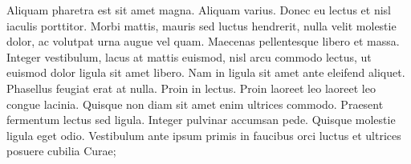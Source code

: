 Aliquam pharetra est sit amet magna. Aliquam varius. Donec eu lectus
et nisl iaculis porttitor. Morbi mattis, mauris sed luctus
hendrerit, nulla velit molestie dolor, ac volutpat urna augue vel
quam. Maecenas pellentesque libero et massa. Integer vestibulum,
lacus at mattis euismod, nisl arcu commodo lectus, ut euismod dolor
ligula sit amet libero. Nam in ligula sit amet ante eleifend
aliquet. Phasellus feugiat erat at nulla. Proin in lectus. Proin
laoreet leo laoreet leo congue lacinia. Quisque non diam sit amet
enim ultrices commodo. Praesent fermentum lectus sed ligula. Integer
pulvinar accumsan pede. Quisque molestie ligula eget odio.
Vestibulum ante ipsum primis in faucibus orci luctus et ultrices
posuere cubilia Curae;
